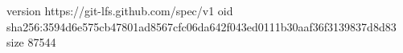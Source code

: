 version https://git-lfs.github.com/spec/v1
oid sha256:3594d6e575cb47801ad8567cfc06da642f043ed0111b30aaf36f3139837d8d83
size 87544
